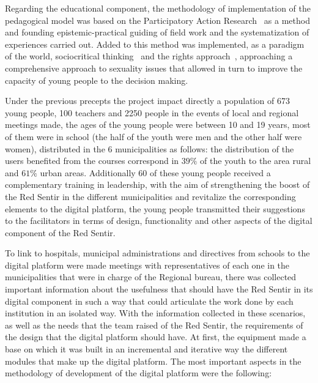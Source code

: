 \documentclass[journal,transmag]{IEEEtran}
\begin{document}
Regarding the educational component, the methodology of implementation of the pedagogical model was based on the Participatory Action Research~\cite{fals2008socialismo} as a method and founding epistemic-practical guiding of field work and the systematization of experiences carried out. Added to this method was implemented, as a paradigm of the world, sociocritical thinking~\cite{stanley1991postmodern} and the rights approach~\cite{unesco}, approaching a comprehensive approach to sexuality issues that allowed in turn to improve the capacity of young people to the decision making.

Under the previous precepts the project impact directly a population of 673 young people, 100 teachers and 2250 people in the events of local and regional meetings made, the ages of the young people were between 10 and 19 years, most of them were in school (the half of the youth were men and the other half were women), distributed in the 6 municipalities as follows: the distribution of the users benefited from the courses correspond in $39\%$ of the youth to the area rural and $61\%$ urban areas. Additionally 60 of these young people received a complementary training in leadership, with the aim of strengthening the boost of the Red Sentir in the different municipalities and revitalize the corresponding elements to the digital platform, the young people transmitted their suggestions to the facilitators in terms of design, functionality and other aspects of the digital component of the Red Sentir.

To link to hospitals, municipal administrations and directives from schools to the digital platform were made meetings with representatives of each one in the municipalities that were in charge of the Regional bureau, there was collected important information about the usefulness that should have the Red Sentir in its digital component in such a way that could articulate the work done by each institution in an isolated way. With the information collected in these scenarios, as well as the needs that the team raised of the Red Sentir, the requirements of the design that the digital platform should have. At first, the equipment made a base on which it was built in an incremental and iterative way the different modules that make up the digital platform. The most important aspects in the methodology of development of the digital platform were the following:
\end{document}
